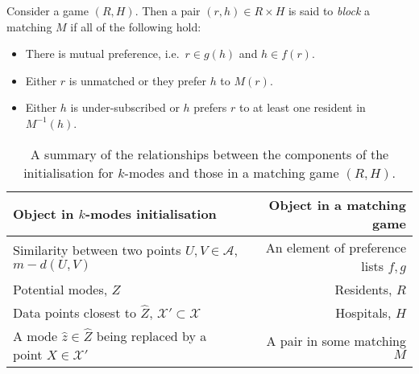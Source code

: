 \begin{definition}\label{def:blocking}
    Consider a game \((R, H)\). Then a pair \((r, h) \in R \times H\) is said to
    \emph{block} a matching \(M\) if all of the following hold:
    \begin{itemize}
        \item There is mutual preference, i.e.\ \(r \in g(h)\) and \(h \in
            f(r)\).
        \item Either \(r\) is unmatched or they prefer \(h\) to \(M(r)\).
        \item Either \(h\) is under-subscribed or \(h\) prefers \(r\) to at
            least one resident in \(M^{-1}(h)\).
    \end{itemize}
\end{definition}

\begin{table}[htbp]
    \begin{tabular}{lcr}
        \toprule%
        Object in \(k\)-modes initialisation & {} & Object in a matching game
        \\\midrule%
        Similarity between two points \(U, V \in \mathcal{A}\),
        \(m - d\left(U, V\right)\) & {} & An element of preference lists
        \(f, g\)
        \\
        Potential modes, \(\widehat Z\) & {} & Residents, \(R\)
        \\
        Data points closest to \(\widehat Z\), \(\mathcal{X}' \subset
        \mathcal{X}\) & {} & Hospitals, \(H\)
        \\
        A mode \(\hat{z} \in \widehat Z\) being replaced by a point \(X \in
        \mathcal{X}'\) & {} & A pair in some matching \(M\)\\
        \bottomrule
    \end{tabular}
    \caption{A summary of the relationships between the components of the
             initialisation for \(k\)-modes and those in a matching game
             \((R, H)\).
    }\label{tab:components}
\end{table}

%



